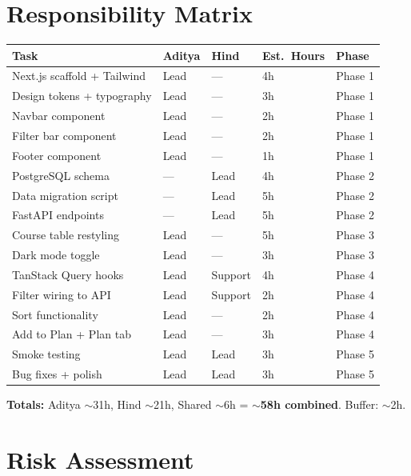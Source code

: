 \documentclass[11pt]{article}
\begin{document}
\section{Responsibility Matrix}

\begin{longtable}{p{} p{} p{} p{} p{}}
\toprule
\textbf{Task} & \textbf{Aditya} & \textbf{Hind} & \textbf{Est.\ Hours} & \textbf{Phase} \\
\midrule
Next.js scaffold + Tailwind & Lead & --- & 4h & Phase 1 \\
Design tokens + typography & Lead & --- & 3h & Phase 1 \\
Navbar component & Lead & --- & 2h & Phase 1 \\
Filter bar component & Lead & --- & 2h & Phase 1 \\
Footer component & Lead & --- & 1h & Phase 1 \\
\midrule
PostgreSQL schema & --- & Lead & 4h & Phase 2 \\
Data migration script & --- & Lead & 5h & Phase 2 \\
FastAPI endpoints & --- & Lead & 5h & Phase 2 \\
\midrule
Course table restyling & Lead & --- & 5h & Phase 3 \\
Dark mode toggle & Lead & --- & 3h & Phase 3 \\
\midrule
TanStack Query hooks & Lead & Support & 4h & Phase 4 \\
Filter wiring to API & Lead & Support & 2h & Phase 4 \\
Sort functionality & Lead & --- & 2h & Phase 4 \\
Add to Plan + Plan tab & Lead & --- & 3h & Phase 4 \\
\midrule
Smoke testing & Lead & Lead & 3h & Phase 5 \\
Bug fixes + polish & Lead & Lead & 3h & Phase 5 \\
\bottomrule
\end{longtable}

\textbf{Totals:} Aditya $\sim$31h, Hind $\sim$21h, Shared $\sim$6h = \textbf{$\sim$58h combined}. Buffer: $\sim$2h.

\section{Risk Assessment}
\end{document}
